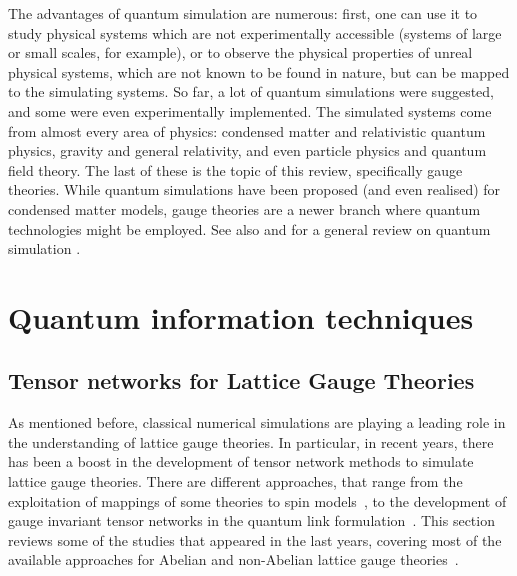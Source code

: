 \documentclass[epj,final]{svjour}
\begin{document}
The advantages of quantum simulation are numerous: first, one can use it to study physical systems which are not experimentally accessible (systems of large or small scales, for example), or to observe the physical properties of unreal physical systems, which are not known to be found in nature, but can be mapped to the simulating systems. So far, a lot of quantum simulations were suggested, and some were even experimentally implemented. The simulated systems come from almost every area of physics: condensed matter and relativistic quantum physics, gravity and general relativity, and even particle physics and quantum field theory.  The last of these is the topic of this review, specifically gauge theories. While quantum simulations have been proposed (and even realised) for condensed matter models, gauge theories are a newer branch where quantum technologies might be employed. See also \cite{mwr2014,bazavov2015gauge,zou2014progress,garcia2015fermion,kasper2016schwinger,dehkharghani2017quantum,kasper2017implementing,kaplan2018gauss,51atom} and for a general review on quantum simulation \cite{trabesinger2012quantum}.

\section{Quantum information techniques}
\label{QItechiques}

\subsection{Tensor networks for Lattice Gauge Theories}

As mentioned before, classical numerical simulations are playing a leading role in the understanding of lattice gauge theories. In particular, in recent years, there has been a boost in the development of tensor network methods to simulate lattice gauge theories. There are different approaches, that range from the exploitation of mappings of some theories to spin models~\cite{banuls2013matrix,Banuls2013}, to the development of gauge invariant tensor networks in the quantum link formulation~\cite{silvi2014lattice,Dalmonte2016,montangero2018,funcke2019topological,PhysRevD.99.074501,banuls2019review}. This section reviews some of the studies that appeared in the last years, covering most of the available approaches for Abelian and non-Abelian lattice gauge theories~\cite{banuls2013matrix,Banuls2013,silvi2014lattice,tagliacozzo2014tensor,buyens2014matrix,rico2014tensor,haegeman2015gauging}. 
\end{document}

